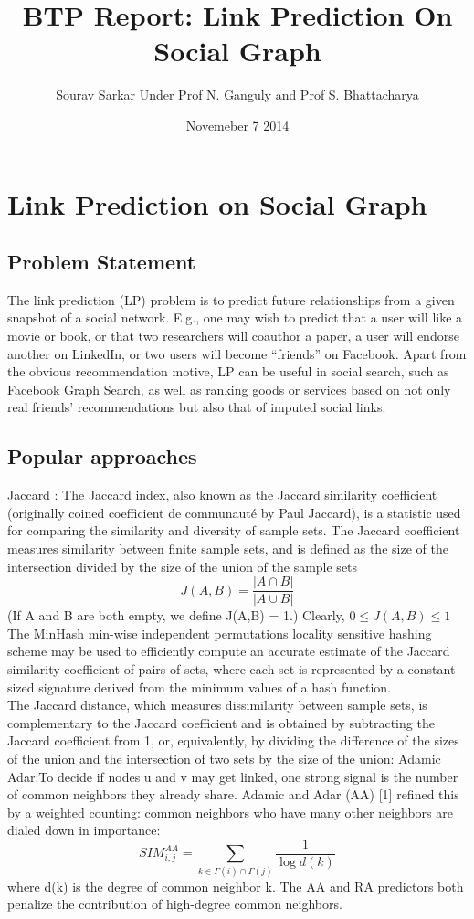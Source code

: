 \documentclass{article}
\title{BTP Report: Link Prediction On Social Graph}
\author{Sourav Sarkar Under Prof N. Ganguly and Prof S. Bhattacharya}
\date{Novemeber 7 2014}
\begin{document}
\maketitle

\newpage
\chapter{Link Prediction on Social Graph}
\section*{Problem Statement}
The link prediction (LP) problem is to predict future relationships from a given snapshot of a social network. E.g., one may wish to predict that a user will like a movie or book, or that two researchers will coauthor a paper, a user will endorse another on LinkedIn, or two users will become “friends” on Facebook. Apart from the obvious recommendation motive, LP can be useful in social search, such as Facebook Graph Search, as well as ranking goods or services based on not only real friends’ recommendations but also that of imputed social links.

\section*{Popular approaches}
Jaccard : The Jaccard index, also known as the Jaccard similarity coefficient (originally coined coefficient de communauté by Paul Jaccard), is a statistic used for comparing the similarity and diversity of sample sets. The Jaccard coefficient measures similarity between finite sample sets, and is defined as the size of the intersection divided by the size of the union of the sample sets
\begin{equation}
J(A,B) = \frac{\left\vert A \cap B \right\vert}{\left\vert A \cup B \right\vert}
\end{equation}
(If A and B are both empty, we define J(A,B) = 1.) Clearly,
$0 \leq J(A,B) \leq 1$
The MinHash min-wise independent permutations locality sensitive hashing scheme may be used to efficiently compute an accurate estimate of the Jaccard similarity coefficient of pairs of sets, where each set is represented by a constant-sized signature derived from the minimum values of a hash function.\\
The Jaccard distance, which measures dissimilarity between sample sets, is complementary to the Jaccard coefficient and is obtained by subtracting the Jaccard coefficient from 1, or, equivalently, by dividing the difference of the sizes of the union and the intersection of two sets by the size of the union:
Adamic Adar:To decide if nodes u and v may get linked, one strong signal is the number of common neighbors they already share. Adamic and Adar (AA) [1] refined this by a weighted counting: common neighbors who have many other neighbors are dialed down in importance:
\begin{equation}
SIM_{i,j}^{AA} = \sum_{k \in \Gamma(i) \cap \Gamma(j)} \frac{1}{\log {d(k)}}
\end{equation}
where d(k) is the degree of common neighbor k. The AA and RA predictors both penalize the contribution of high-degree common neighbors.
\end{document}
